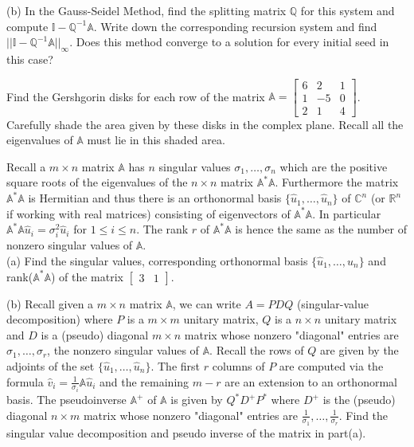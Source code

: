 \documentclass[12pt]{article}
\begin{document}
\newpage

\noindent
(b) In the Gauss-Seidel Method, find the splitting matrix $\mathbb{Q}$ for this system and compute 
$\mathbb{I} - \mathbb{Q}^{-1} \mathbb{A}$. Write down the corresponding recursion system and 
find $|| \mathbb{I}-\mathbb{Q}^{-1}\mathbb{A}||_{\infty}$. Does this method converge to a solution for every initial seed in this case?\\

\vspace{3in}

Find the Gershgorin disks for each row of the matrix $\mathbb{A} = \begin{bmatrix} 6 & 2 & 1 \\ 1 & -5 & 0 \\ 2 & 1 & 4 \end{bmatrix}$. 
Carefully shade the area given by these disks in the complex plane. Recall all the eigenvalues of $\mathbb{A}$ must lie in this shaded area.

\vspace{3in}

Recall a $m \times n$ matrix $\mathbb{A}$ has $n$ singular values $\sigma_1, \dots, \sigma_n$ which are the 
positive square roots of the eigenvalues of the $n \times n$ matrix $\mathbb{A}^* \mathbb{A}$. Furthermore the matrix $\mathbb{A}^* \mathbb{A}$ is Hermitian and thus there 
is an orthonormal basis $\{ \hat{u}_1, \dots, \hat{u}_n \}$ of $\mathbb{C}^n$ (or $\mathbb{R}^n$ if working with real matrices) consisting of eigenvectors of $\mathbb{A}^*\mathbb{A}$. In particular $\mathbb{A}^*\mathbb{A} \hat{u}_i = \sigma_i^2 \hat{u}_i$ for $1 \leq i \leq n$. The rank $r$ of $\mathbb{A}^* \mathbb{A}$ 
is hence the same as the number of nonzero singular values of $\mathbb{A}$. \\
(a) Find the singular values, corresponding orthonormal basis $\{ \hat{u}_1, \dots, \hat{u}_n \}$ and rank($\mathbb{A}^*\mathbb{A}$) of the matrix 
$\begin{bmatrix} 3 & 1 \end{bmatrix}$.

\vspace{3in}
\noindent
(b) Recall given a $m \times n$ matrix $\mathbb{A}$, we can write $A=PDQ$ (singular-value decomposition) where $P$ is a $m \times m$ unitary matrix, $Q$ is a $n \times n$ unitary matrix and $D$ is a (pseudo) diagonal $m \times n$ matrix whose nonzero "diagonal" entries are $\sigma_1, \dots, \sigma_r$, the nonzero singular values of $\mathbb{A}$. Recall the rows of $Q$ are given by the adjoints of the set $\{ \hat{u}_1, \dots, \hat{u}_n \}$. The first $r$ columns of $P$ are computed 
via the formula $\hat{v}_i = \frac{1}{\sigma_i} \mathbb{A} \hat{u}_i$ and the remaining $m-r$ are an extension to an orthonormal basis. The pseudoinverse 
$\mathbb{A}^+$ of $\mathbb{A}$ is given by $Q^*D^+P^*$ where $D^+$ is the (pseudo) diagonal $n \times m$ matrix whose nonzero 
"diagonal" entries are $\frac{1}{\sigma_1}, \dots, \frac{1}{\sigma_r}$. Find the singular value decomposition and pseudo inverse of the matrix 
in part(a). \\
\end{document}
